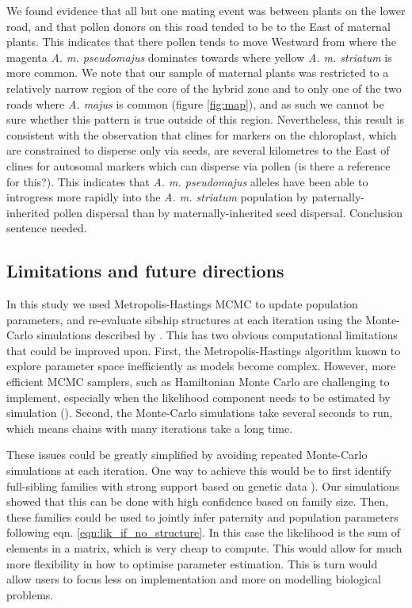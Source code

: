\documentclass[10pt, a4paper, twocolumn]{article} %
\begin{document}
We found evidence that all but one mating event was between plants on the lower road, and that pollen donors on this road tended to be to the East of maternal plants.
This indicates that there pollen tends to move Westward from where the magenta \textit{A. m. pseudomajus} dominates towards where yellow \textit{A. m. striatum} is more common.
We note that our sample of maternal plants was restricted to a relatively narrow region of the core of the hybrid zone and to only one of the two roads where \textit{A. majus} is common (figure \ref{fig:map}), and as such we cannot be sure whether this pattern is true outside of this region.
Nevertheless, this result is consistent with the observation that clines for markers on the chloroplast, which are constrained to disperse only via seeds, are several kilometres to the East of clines for autosomal markers which can disperse via pollen (is there a reference for this?).
This indicates that \textit{A. m. pseudomajus} alleles have been able to introgress more rapidly into the \textit{A. m. striatum} population by paternally-inherited pollen dispersal than by maternally-inherited seed dispersal.
Conclusion sentence needed. 

\subsection{Limitations and future directions}

In this study we used Metropolis-Hastings MCMC to update population parameters, and re-evaluate sibship structures at each iteration using the Monte-Carlo simulations described by \textcite{ellis2018efficient}.
This has two obvious computational limitations that could be improved upon.
First, the Metropolis-Hastings algorithm known to explore parameter space inefficiently as models become complex.
However, more efficient MCMC samplers, such as Hamiltonian Monte Carlo are challenging to implement, especially when the likelihood component needs to be estimated by simulation (\cite{betancourt2017conceptual}).
Second, the Monte-Carlo simulations take several seconds to run, which means chains with many iterations take a long time.

These issues could be greatly simplified by avoiding repeated Monte-Carlo simulations at each iteration.
One way to achieve this would be to first identify full-sibling families with strong support based on genetic data \cite{ellis2018efficient}).
Our simulations showed that this can be done with high confidence based on family size.
Then, these families could be used to jointly infer paternity and population parameters following eqn. \ref{eqn:lik_if_no_structure}.
In this case the likelihood is the sum of elements in a matrix, which is very cheap to compute.
This would allow for much more flexibility in how to optimise parameter estimation.
This is turn would allow users to focus less on implementation and more on modelling biological problems.
\end{document}
